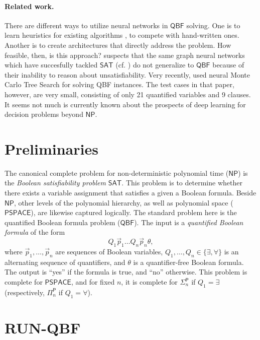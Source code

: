 \documentclass[12pt]{article}
\newcommand*{\NP}{\mathsf{NP}}
\newcommand*{\PTIME}{\mathsf{P}}
\newcommand*{\SAT}{\mathsf{SAT}}
\newcommand*{\PSPACE}{\mathsf{PSPACE}}
\newcommand*{\QBF}{\mathsf{QBF}}
\newcommand*{\RUNQBF}{\textrm{RUN-QBF}\xspace}
\begin{document}
\paragraph{Related work.} There are different ways to utilize neural networks in $\QBF$ solving. One is to learn heuristics for existing algorithms \cite{LedermanRSL20}, to compete with hand-written ones. Another is to create architectures that directly address the problem.  How feasible, then, is this approach? \cite{abs-1904-12084} suspects that the same graph neural networks which have succesfully tackled $\SAT$ (cf. \cite{SelsamLBLMD19}) do not generalize to $\QBF$ because of their inability to reason about unsatisfiability. Very recently, \cite{abs-2101-06619} used neural Monte Carlo Tree Search for solving QBF instances. The test cases in that paper, however, are very small, consisting of only 21 quantified variables and 9 clauses. It seems not much is currently known about the prospects of deep learning for decision problems beyond $\NP$.

\section{Preliminaries}
The canonical complete problem for non-deterministic polynomial time ($\NP$) is the \emph{Boolean satisfiability problem} $\SAT$. This problem is to determine whether there exists a variable assignment that satisfies a given a Boolean formula. Beside $\NP$, other levels of the polynomial hierarchy, as well as polynomial space ($\PSPACE$), are likewise captured logically. The standard problem here is the quantified Boolean formula problem ($\QBF$).  The input is a \emph{quantified Boolean formula} of the form
\[
Q_1 \vec p_1 \ldots Q_n \vec p_n\theta,
\]
where $\vec p_1, \ldots ,\vec p_n$ are sequences of Boolean variables,  $Q_1, \ldots ,Q_n\in \{\exists ,\forall\}$ is an alternating sequence of quantifiers, and $\theta$ is a quantifier-free Boolean formula. The output is ``yes'' if the formula is true, and ``no'' otherwise. This problem is complete for $\PSPACE$, and for fixed $n$, it is complete for $\Sigma^\PTIME_n$ if $Q_1=\exists$ (respectively, $\Pi^\PTIME_n$ if $Q_1=\forall$).


\section{\RUNQBF}
\end{document}
